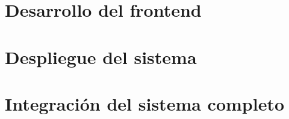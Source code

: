 
\section{Desarrollo del frontend}


\section{Despliegue del sistema}


\section{Integración del sistema completo}

